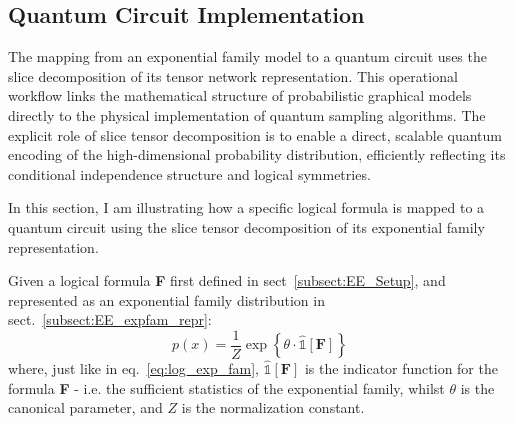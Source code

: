 \documentclass[encoding=utf8,british]{tumphthesis}
\begin{document}
        \subsection{Quantum Circuit Implementation}
            The mapping from an exponential family model to a quantum circuit uses the slice decomposition of its tensor 
            network representation. This operational workflow links the mathematical structure of probabilistic graphical models 
            directly to the physical implementation of quantum sampling algorithms. The explicit role of slice tensor decomposition 
            is to enable a direct, scalable quantum encoding of the high-dimensional probability distribution, efficiently reflecting 
            its conditional independence structure and logical symmetries.

            In this section, I am illustrating how a specific logical formula is mapped to a quantum circuit using the slice tensor 
            decomposition of its exponential family representation.

            Given a logical formula \textbf{F} first defined in sect~\ref{subsect:EE_Setup}, and represented as an exponential family distribution in sect.~\ref{subsect:EE_expfam_repr}:
            \begin{equation*}
                p(x) = \frac{1}{Z} \exp\left\{ \theta \cdot \hat{\mathbb{1}}[\textbf{F}] \right\}
            \end{equation*}
            where, just like in eq.~\ref{eq:log_exp_fam}, $\hat{\mathbb{1}}[\textbf{F}]$ is the indicator function for the formula \textbf{F} - i.e. the sufficient statistics of the 
            exponential family, whilst $\theta$ is the canonical parameter, and $Z$ is the normalization constant.
            
\end{document}
